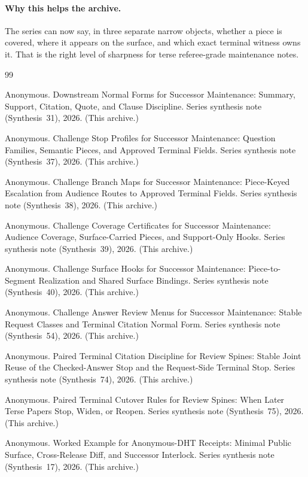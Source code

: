 \documentclass[11pt]{article}
\begin{document}
\paragraph{Why this helps the archive.}
The series can now say, in three separate narrow objects, whether a piece is covered, where it appears on the surface, and which exact terminal witness owns it.
That is the right level of sharpness for terse referee-grade maintenance notes.

\begin{thebibliography}{99}\small

Anonymous.
\newblock Downstream Normal Forms for Successor Maintenance: Summary, Support, Citation, Quote, and Clause Discipline.
\newblock Series synthesis note (Synthesis~31), 2026. (This archive.)

Anonymous.
\newblock Challenge Stop Profiles for Successor Maintenance: Question Families, Semantic Pieces, and Approved Terminal Fields.
\newblock Series synthesis note (Synthesis~37), 2026. (This archive.)

Anonymous.
\newblock Challenge Branch Maps for Successor Maintenance: Piece-Keyed Escalation from Audience Routes to Approved Terminal Fields.
\newblock Series synthesis note (Synthesis~38), 2026. (This archive.)

Anonymous.
\newblock Challenge Coverage Certificates for Successor Maintenance: Audience Coverage, Surface-Carried Pieces, and Support-Only Hooks.
\newblock Series synthesis note (Synthesis~39), 2026. (This archive.)

Anonymous.
\newblock Challenge Surface Hooks for Successor Maintenance: Piece-to-Segment Realization and Shared Surface Bindings.
\newblock Series synthesis note (Synthesis~40), 2026. (This archive.)

Anonymous.
\newblock Challenge Answer Review Menus for Successor Maintenance: Stable Request Classes and Terminal Citation Normal Form.
\newblock Series synthesis note (Synthesis~54), 2026. (This archive.)

Anonymous.
\newblock Paired Terminal Citation Discipline for Review Spines: Stable Joint Reuse of the Checked-Answer Stop and the Request-Side Terminal Stop.
\newblock Series synthesis note (Synthesis~74), 2026. (This archive.)

Anonymous.
\newblock Paired Terminal Cutover Rules for Review Spines: When Later Terse Papers Stop, Widen, or Reopen.
\newblock Series synthesis note (Synthesis~75), 2026. (This archive.)

Anonymous.
\newblock Worked Example for Anonymous-DHT Receipts: Minimal Public Surface, Cross-Release Diff, and Successor Interlock.
\newblock Series synthesis note (Synthesis~17), 2026. (This archive.)

\end{thebibliography}
\end{document}
